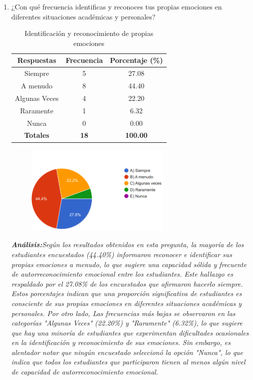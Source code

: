 \documentclass[journal]{IEEEtran}
\begin{document}
\begin{enumerate}
	
	\item ¿Con qué frecuencia identificas y reconoces tus propias emociones en diferentes situaciones académicas y personales?
	\begin{table}[H]
		\renewcommand{\arraystretch}{1.3}
		\centering
		\caption{Identificación y reconocimiento de propias emociones}
		\begin{tabular}{c c c}
			\hline
			\textbf{Respuestas} & \textbf{Frecuencia} & \textbf{Porcentaje (\%)}\\
			\hline
			Siempre & 5 & 27.08 \\
			A menudo & 8 & 44.40 \\
			Algunas Veces & 4 & 22.20\\
			Raramente & 1 & 6.32\\
			Nunca & 0 & 0.00\\
			\hline
			\textbf{Totales} &\textbf{18}& \textbf{100.00}\\
			\hline
		\end{tabular}
	\end{table}
	\begin{figure}[h]
		\centering
		\includegraphics[width=07cm]{Pregunta 1}
	\end{figure}
	\textit{\textbf{Análisis:}Según los resultados obtenidos en esta pregunta, la mayoría de los estudiantes encuestados (44.40\%) informaron reconocer e identificar sus propias emociones a menudo, lo que sugiere una capacidad sólida y frecuente de autorreconocimiento emocional entre los estudiantes. Este hallazgo es respaldado por el 27.08\% de los encuestados que afirmaron hacerlo siempre. Estos porcentajes indican que una proporción significativa de estudiantes es consciente de sus propias emociones en diferentes situaciones académicas y personales.
Por otro lado, Las frecuencias más bajas se observaron en las categorías "Algunas Veces" (22.20\%) y "Raramente" (6.32\%), lo que sugiere que hay una minoría de estudiantes que experimentan dificultades ocasionales en la identificación y reconocimiento de sus emociones. Sin embargo, es alentador notar que ningún encuestado seleccionó la opción "Nunca", lo que indica que todos los estudiantes que participaron tienen al menos algún nivel de capacidad de autorreconocimiento emocional.
}\\


\end{enumerate}
\end{document}
